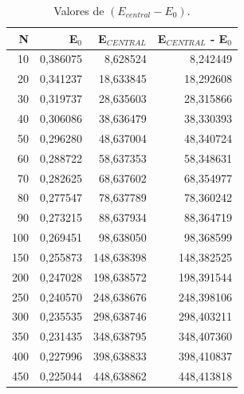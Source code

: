 \begin{table}[htbp]
	\centering
	\caption{Valores de $(E_{central} - E_0)$.}
	\label{tab:ValoresDeECentralE02}
\begin{tabular}{rrrr}
\hline
         \textbf{N} & \textbf{E$_{0}$} &   \textbf{E$_{CENTRAL}$} & \textbf{E$_{CENTRAL}$} - \textbf{E$_{0}$} \\
\hline
        10 &   0,386075 &   8,628524 &   8,242449 \\

        20 &   0,341237 &  18,633845 &  18,292608 \\

        30 &   0,319737 &  28,635603 &  28,315866 \\

        40 &   0,306086 &  38,636479 &  38,330393 \\

        50 &   0,296280 &  48,637004 &  48,340724 \\

        60 &   0,288722 &  58,637353 &  58,348631 \\

        70 &   0,282625 &  68,637602 &  68,354977 \\

        80 &   0,277547 &  78,637789 &  78,360242 \\

        90 &   0,273215 &  88,637934 &  88,364719 \\

       100 &   0,269451 &  98,638050 &  98,368599 \\

       150 &   0,255873 & 148,638398 & 148,382525 \\

       200 &   0,247028 & 198,638572 & 198,391544 \\

       250 &   0,240570 & 248,638676 & 248,398106 \\

       300 &   0,235535 & 298,638746 & 298,403211 \\

       350 &   0,231435 & 348,638795 & 348,407360 \\

       400 &   0,227996 & 398,638833 & 398,410837 \\

       450 &   0,225044 & 448,638862 & 448,413818 \\


\end{tabular}
\end{table}
